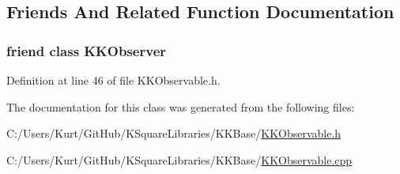 \subsection{Friends And Related Function Documentation}
\subsubsection[{\texorpdfstring{K\+K\+Observer}{KKObserver}}]{\setlength{\rightskip}{0pt plus 5cm}friend class {\bf K\+K\+Observer}\hspace{0.3cm}{\ttfamily [friend]}}\hypertarget{class_k_k_b_1_1_k_k_observable_a782cf8bb982a5d411e9e64e3d40ea014}{}\label{class_k_k_b_1_1_k_k_observable_a782cf8bb982a5d411e9e64e3d40ea014}


Definition at line 46 of file K\+K\+Observable.\+h.



The documentation for this class was generated from the following files\+:\begin{DoxyCompactItemize}
\item 
C\+:/\+Users/\+Kurt/\+Git\+Hub/\+K\+Square\+Libraries/\+K\+K\+Base/\hyperlink{_k_k_observable_8h}{K\+K\+Observable.\+h}\item 
C\+:/\+Users/\+Kurt/\+Git\+Hub/\+K\+Square\+Libraries/\+K\+K\+Base/\hyperlink{_k_k_observable_8cpp}{K\+K\+Observable.\+cpp}\end{DoxyCompactItemize}
